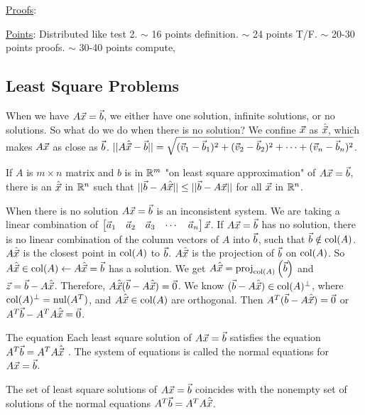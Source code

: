 \documentclass[10pt,a4paper]{article}
\begin{document}
\underline{Proofs}: 

\underline{Points}: Distributed like test 2. $\sim$ 16 points definition. $\sim$ 24 points T/F. $\sim$ 20-30 points proofs. $\sim$ 30-40 points compute,

\subsection{Least Square Problems}

When we have $A\vec{x}=\vec{b}$, we either have one solution, infinite solutions, or no solutions. So what do we do when there is no solution? We confine $\vec{x}$ as $\hat {\vec{x}}$, which makes $A\vec{x}$ as close as $\vec{b}$. $||A\hat{\vec{x}}-\vec{b}|| = \sqrt{(\vec{v}_1-\vec{b}_1)^2 + (\vec{v}_2-\vec{b}_2)^2 + \cdots + (\vec{v}_n - \vec{b}_n)^2}$.
\begin{definition}
	If $A$ is $m\times n$ matrix and $b$ is in $\mathbb{R}^m$ "on least square approximation" of $A\vec{x} = \vec{b}$, there is an $\hat{\vec{x}}$ in $\mathbb{R}^n$ such that $||\vec{b}-A\hat{\vec{x}}||\leq ||\vec{b}-A\vec{x}||$ for all $\vec{x}$ in $\mathbb{R}^n$.
\end{definition}
When there is no solution $A\vec{x}=\vec{b}$ is an inconsistent system. We are taking a linear combination of $\begin{bmatrix}\vec{a}_1 & \vec{a}_2 & \vec{a}_3 & \cdots & \vec{a}_n\end{bmatrix}\vec{x}$. If $A\vec{x} = \vec{b}$ has no solution, there is no linear combination of the column vectors of $A$ into $\vec{b}$, such that $\vec{b}\notin\text{col}(A)$.
$A\hat{\vec{x}}$ is the closest point in $\text{col}(A)$ to $\vec{b}$. $A\hat{\vec{x}}$ is the projection of $\vec{b}$ on $\text{col}(A)$. 
So $A\hat{\vec{x}}\in\text{col}(A) \leftarrow A\hat{\vec{x}}=\vec{b}$ has a solution. We get $A\hat{\vec{x}} = \text{proj}_{\text{col}(A)}\left(\vec{b}\right)$ and $\vec{z} = \vec{b}-A\hat{\vec{x}}$. Therefore, $A\hat{\vec{x}}(\vec{b}-A\hat{\vec{x}}) = \vec{0}$. We know $(\vec{b}-A\hat{\vec{x}})\in\text{col}(A)^\perp$, where $\text{col}(A)^\perp = \text{nul}(A^T)$, and $A\hat{\vec{x}}\in\text{col}(A)$ are orthogonal.
Then $A^T(\vec{b}-A\hat{\vec{x}}) = \vec{0}$ or $A^T\vec{b} - A^T A\hat{\vec{x}} = \vec{0}$.
\begin{definition}
	The equation 
	Each least square solution of $A\vec{x} = \vec{b}$ satisfies the equation $A^T\vec{b} = A^TA\hat{\vec{x}}$ . The system of equations is called the normal equations for $A\vec{x} = \vec{b}$.
\end{definition}
\begin{theorem}
	The set of least square solutions of $A\vec{x}=\vec{b}$ coincides with the nonempty set of solutions of the normal equations $A^T\vec{b} = A^TA\hat{\vec{x}}$.
\end{theorem}
\end{document}
